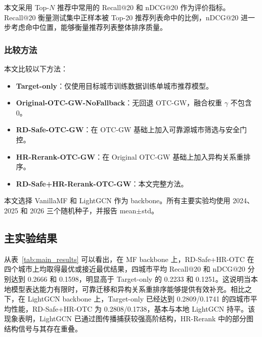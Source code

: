\documentclass[10pt,twocolumn]{ctexart}
\begin{document}
本文采用 Top-$N$ 推荐中常用的 Recall@20 和 nDCG@20 作为评价指标。Recall@20 衡量测试集中正样本被 Top-20 推荐列表命中的比例，nDCG@20 进一步考虑命中位置，能够衡量推荐列表整体排序质量。

\subsubsection{比较方法}

本文比较以下方法：
\begin{itemize}
    \item \textbf{Target-only}：仅使用目标城市训练数据训练单城市推荐模型。
    \item \textbf{Original-OTC-GW-NoFallback}：无回退 OTC-GW，融合权重 $\gamma$ 不包含 0。
    \item \textbf{RD-Safe-OTC-GW}：在 OTC-GW 基础上加入可靠源城市筛选与安全门控。
    \item \textbf{HR-Rerank-OTC-GW}：在 Original OTC-GW 基础上加入异构关系重排序。
    \item \textbf{RD-Safe+HR-Rerank-OTC-GW}：本文完整方法。
\end{itemize}

本文选择 VanillaMF 和 LightGCN 作为 backbone。所有主要实验均使用 2024、2025 和 2026 三个随机种子，并报告 mean$\pm$std。

\subsection{主实验结果}


从表~\ref{tab:main_results} 可以看出，在 MF backbone 上，RD-Safe+HR-OTC 在四个城市上均取得最优或接近最优结果，四城市平均 Recall@20 和 nDCG@20 分别达到 0.2666 和 0.1598，明显高于 Target-only 的 0.2233 和 0.1251。这说明当本地模型表达能力有限时，可靠迁移和异构关系重排序能够提供有效补充。相比之下，在 LightGCN backbone 上，Target-only 已经达到 0.2809/0.1741 的四城市平均性能，RD-Safe+HR-OTC 为 0.2808/0.1738，基本与本地 LightGCN 持平。该现象表明，LightGCN 已通过图传播捕获较强高阶结构，HR-Rerank 中的部分图结构信号与其存在重叠。
\end{document}

